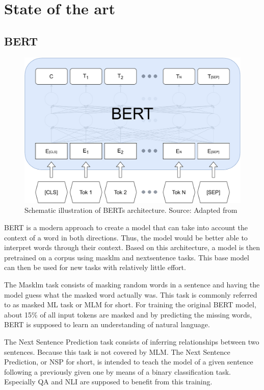 \chapter{State of the art}
\section{BERT}
\begin{figure}
	\includegraphics[width=\linewidth]{src/BERT.pdf}
	\caption{Schematic illustration of BERTs architecture. \newline Source: Adapted from \cite{Devlin2018}}
\end{figure}
BERT is a modern approach to create a model that can take into account the context of a word in both directions. Thus, the model would be better able to interpret words through their context. Based on this architecture, a model is then pretrained on a corpus using masklm and nextsentence tasks. This base model can then be used for new tasks with relatively little effort.

The Masklm task consists of masking random words in a sentence and having the model guess what the masked word actually was. This task is commonly referred to as masked ML task or MLM for short. For training the original BERT model, about 15\% of all input tokens are masked and by predicting the missing words, BERT is supposed to learn an understanding of natural language.

The Next Sentence Prediction task consists of inferring relationships between two sentences. Because this task is not covered by MLM. The Next Sentence Prediction, or NSP for short, is intended to teach the model of a given sentence following a previously given one by means of a binary classification task. Especially QA and NLI are supposed to benefit from this training. 

